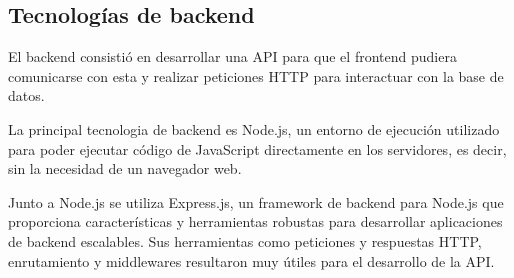 \subsection{Tecnologías de backend}
El backend consistió en desarrollar una API para que el frontend pudiera comunicarse con esta y realizar peticiones HTTP para interactuar con la base de datos.

La principal tecnologia de backend es Node.js, un entorno de ejecución utilizado para poder ejecutar código de JavaScript directamente en los servidores, es decir, sin la necesidad de un navegador web.

Junto a Node.js se utiliza Express.js, un framework de backend para Node.js que proporciona características y herramientas robustas para desarrollar aplicaciones de backend escalables. Sus herramientas como peticiones y respuestas HTTP, enrutamiento y middlewares resultaron muy útiles para el desarrollo de la API.